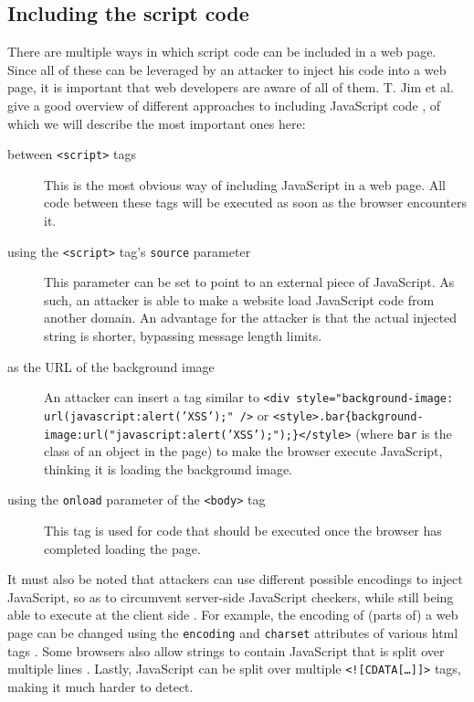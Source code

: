 \subsection{Including the script code}\label{injecting-script}
There are multiple ways in which script code can be included in a web page. Since all of these can be leveraged by an attacker to inject his code into a web page, it is important that web developers are aware of all of them. T. Jim et al. give a good overview of different approaches to including JavaScript code \cite{Jim2007}, of which we will describe the most important ones here:
\begin{description}
	\item[between \texttt{<script>} tags] This is the most obvious way of including JavaScript in a web page. All code between these tags will be executed as soon as the browser encounters it.
	\item[using the \texttt{<script>} tag's \texttt{source} parameter] This parameter can be set to point to an external piece of JavaScript. As such, an attacker is able to make a website load JavaScript code from another domain. An advantage for the attacker is that the actual injected string is shorter, bypassing message length limits.
	\item[as the URL of the background image] An attacker can insert a tag similar to \texttt{<div style="background-image: url(javascript:alert('XSS');" />} or \texttt{<style>.bar\{background-image:url("javascript:alert('XSS');");\}</style>} (where \texttt{bar} is the class of an object in the page) to make the browser execute JavaScript, thinking it is loading the background image.
	\item[using the \texttt{onload} parameter of the \texttt{<body>} tag] This tag is used for code that should be executed once the browser has completed loading the page.
\end{description}

It must also be noted that attackers can use different possible encodings to inject JavaScript, so as to circumvent server-side JavaScript checkers, while still being able to execute at the client side \cite{Jim2007}. For example, the encoding of (parts of) a web page can be changed using the \texttt{encoding} and \texttt{charset} attributes of various \gls{html} tags \cite{Ishida2010}. Some browsers also allow strings to contain JavaScript that is split over multiple lines \cite{Jim2007}. Lastly, JavaScript can be split over multiple  \texttt{<![CDATA[\dots]]>} tags, making it much harder to detect.

